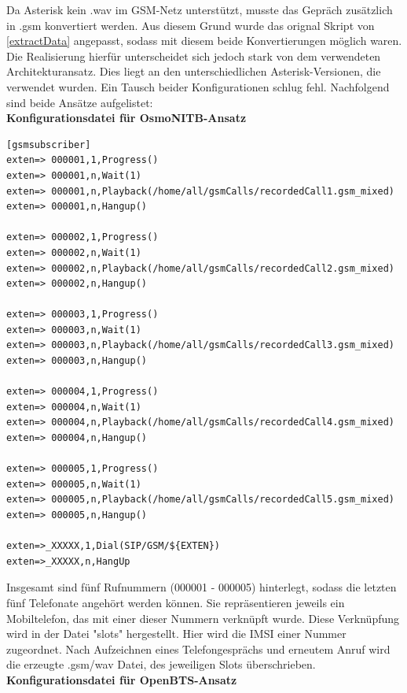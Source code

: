 Da Asterisk kein .wav im GSM-Netz unterstützt, musste das Gepräch zusätzlich in .gsm konvertiert werden. Aus diesem Grund wurde das orignal Skript von \ref{extractData} angepasst, sodass mit diesem beide Konvertierungen möglich waren.\\

Die Realisierung hierfür unterscheidet sich jedoch stark von dem verwendeten Architekturansatz. Dies liegt an den unterschiedlichen Asterisk-Versionen, die verwendet wurden. Ein Tausch beider Konfigurationen schlug fehl. Nachfolgend sind beide Ansätze aufgelistet:\\




\textbf{Konfigurationsdatei für OsmoNITB-Ansatz}

\begin{lstlisting}
[gsmsubscriber]
exten=> 000001,1,Progress()
exten=> 000001,n,Wait(1)
exten=> 000001,n,Playback(/home/all/gsmCalls/recordedCall1.gsm_mixed)
exten=> 000001,n,Hangup()

exten=> 000002,1,Progress()
exten=> 000002,n,Wait(1)
exten=> 000002,n,Playback(/home/all/gsmCalls/recordedCall2.gsm_mixed)
exten=> 000002,n,Hangup()

exten=> 000003,1,Progress()
exten=> 000003,n,Wait(1)
exten=> 000003,n,Playback(/home/all/gsmCalls/recordedCall3.gsm_mixed)
exten=> 000003,n,Hangup()

exten=> 000004,1,Progress()
exten=> 000004,n,Wait(1)
exten=> 000004,n,Playback(/home/all/gsmCalls/recordedCall4.gsm_mixed)
exten=> 000004,n,Hangup()

exten=> 000005,1,Progress()
exten=> 000005,n,Wait(1)
exten=> 000005,n,Playback(/home/all/gsmCalls/recordedCall5.gsm_mixed)
exten=> 000005,n,Hangup()

exten=>_XXXXX,1,Dial(SIP/GSM/${EXTEN})
exten=>_XXXXX,n,HangUp
\end{lstlisting}

Insgesamt sind fünf Rufnummern (000001 - 000005) hinterlegt, sodass die letzten fünf Telefonate angehört werden können. Sie repräsentieren jeweils ein Mobiltelefon, das mit einer dieser Nummern verknüpft wurde. Diese Verknüpfung wird in der Datei "slots" hergestellt. Hier wird die IMSI einer Nummer zugeordnet. 
Nach Aufzeichnen eines Telefongesprächs und erneutem Anruf wird die erzeugte .gsm/wav Datei, des jeweiligen Slots überschrieben.\\



\textbf{Konfigurationsdatei für OpenBTS-Ansatz}

